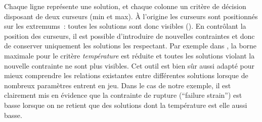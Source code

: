 Chaque ligne représente une solution, et chaque colonne un critère de décision disposant de
deux curseurs (min et max). À l’origine les curseurs sont positionnés sur les extremums~:
toutes les solutions sont donc visibles (). En contrôlant la
position des curseurs, il est possible d’introduire de nouvelles contraintes et donc
de conserver uniquement les solutions les respectant. Par exemple dans ,
la borne maximale pour le critère \emph{température} est réduite et toutes les solutions
violant la nouvelle contrainte ne sont plus visibles. Cet outil est bien sûr aussi adapté
pour mieux comprendre les relations existantes entre différentes solutions lorsque de
nombreux paramètres entrent en jeu. Dans le cas de notre exemple, il est clairement mis en
évidence que la contrainte de rupture (\enquote{failure strain}) est basse lorsque on ne
retient que des solutions dont la température est elle aussi basse.


